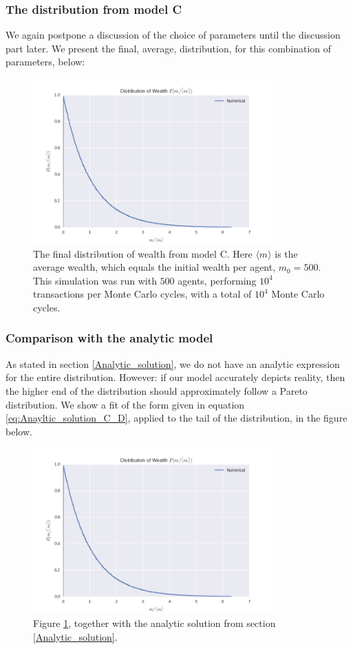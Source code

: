 \documentclass[a4paper, 10pt]{article}
\begin{document}
\subsubsection{The distribution from model C}
We again postpone a discussion of the choice of parameters until the discussion part later. We present the final, average, distribution, for this combination of parameters, below:
\begin{figure}[!ht]
\centering
\includegraphics[height=2.5in]{distLamb0.png} %
\caption{The final distribution of wealth from model C. Here $\langle m \rangle$ is the average wealth, which equals the initial wealth per agent, $m_0=500$. This simulation was run with $500$ agents, performing $10^4$ transactions per Monte Carlo cycles, with a total of $10^4$ Monte Carlo cycles.}\label{fig:ModelC_final_distribution}
\end{figure}
\subsubsection{Comparison with the analytic model}
As stated in section \ref{Analytic_solution}, we do not have an analytic expression for the entire distribution. However: if our model accurately depicts reality, then the higher end of the distribution should approximately follow a Pareto distribution. We show a fit of the form given in equation \ref{eq:Anayltic_solution_C_D}, applied to the tail of the distribution, in the figure below.
\begin{figure}[!ht]
\centering
\includegraphics[height=2.5in]{distLamb0.png} %
\caption{Figure \ref{fig:ModelC_final_distribution}, together with the analytic solution from section \ref{Analytic_solution}.}\label{fig:ModelC_final_distribution_with_analytic}
\end{figure}
\end{document}
